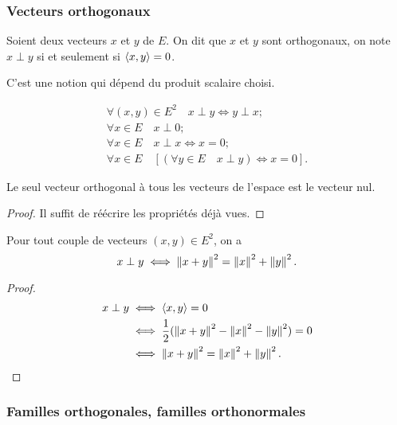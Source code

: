 \subsubsection{Vecteurs orthogonaux}

\begin{defdef}
  Soient deux vecteurs $x$ et $y$ de $E$. On dit que $x$ et $y$ sont orthogonaux, on note $x \perp y$ si et seulement si $\left\langle{x},{y}\right\rangle=0$.
\end{defdef}

\danger C'est une notion qui dépend du produit scalaire choisi.

\begin{prop}
  \begin{gather}
    \forall (x,y) \in E^2 \quad x \perp y \iff y \perp x;\\
    \forall x \in E \quad x \perp 0;\\
    \forall x \in E \quad x \perp x \iff x=0;\\
    \forall x \in E \quad [(\forall y \in E \quad x \perp y) \iff x=0].
  \end{gather}
\end{prop}

Le seul vecteur orthogonal à tous les vecteurs de l'espace est le vecteur nul.
\begin{proof}
  Il suffit de réécrire les propriétés déjà vues.
\end{proof}
\begin{theo}
  Pour tout couple de vecteurs $(x,y) \in E^2$, on a
  \begin{equation}
    x \perp y \iff \left\lVert x+y\right\rVert^2 = \left\lVert x\right\rVert^2 + \left\lVert y\right\rVert^2.
  \end{equation}
\end{theo}
\begin{proof}
  \begin{align}
    x \perp y &\iff \left\langle{x},{y}\right\rangle=0 \\
    &\iff \frac{1}{2} (\left\lVert x+y\right\rVert^2-\left\lVert x\right\rVert^2-\left\lVert y\right\rVert^2)=0 \\
    &\iff \left\lVert x+y\right\rVert^2 = \left\lVert x\right\rVert^2 + \left\lVert y\right\rVert^2.
  \end{align}
\end{proof}

\subsubsection{Familles orthogonales, familles orthonormales}

